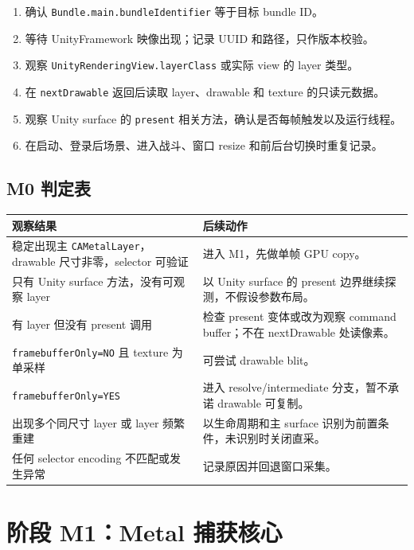 \documentclass[UTF8,a4paper,11pt]{ctexart}
\begin{document}
\begin{enumerate}
  \item 确认 \texttt{Bundle.main.bundleIdentifier} 等于目标 bundle ID。
  \item 等待 UnityFramework 映像出现；记录 UUID 和路径，只作版本校验。
  \item 观察 \texttt{UnityRenderingView.layerClass} 或实际 view 的 layer 类型。
  \item 在 \texttt{nextDrawable} 返回后读取 layer、drawable 和 texture 的只读元数据。
  \item 观察 Unity surface 的 \texttt{present} 相关方法，确认是否每帧触发以及运行线程。
  \item 在启动、登录后场景、进入战斗、窗口 resize 和前后台切换时重复记录。
\end{enumerate}

\subsection{M0 判定表}

\begin{center}
\small
\begin{tabularx}{\textwidth}{>{\raggedright\arraybackslash}p{} X}
\toprule
观察结果 & 后续动作 \\
\midrule
稳定出现主 \texttt{CAMetalLayer}，drawable 尺寸非零，selector 可验证 & 进入 M1，先做单帧 GPU copy。\\
只有 Unity surface 方法，没有可观察 layer & 以 Unity surface 的 present 边界继续探测，不假设参数布局。\\
有 layer 但没有 present 调用 & 检查 present 变体或改为观察 command buffer；不在 nextDrawable 处读像素。\\
\texttt{framebufferOnly=NO} 且 texture 为单采样 & 可尝试 drawable blit。\\
\texttt{framebufferOnly=YES} & 进入 resolve/intermediate 分支，暂不承诺 drawable 可复制。\\
出现多个同尺寸 layer 或 layer 频繁重建 & 以生命周期和主 surface 识别为前置条件，未识别时关闭直采。\\
任何 selector encoding 不匹配或发生异常 & 记录原因并回退窗口采集。\\
\bottomrule
\end{tabularx}
\end{center}

\section{阶段 M1：Metal 捕获核心}
\end{document}
